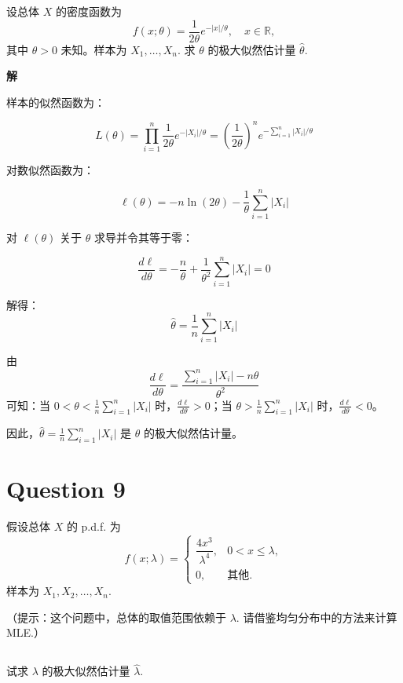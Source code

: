\documentclass[12pt,a4paper]{article}
\begin{document}
设总体 $X$ 的密度函数为
\[
    f(x;\theta)=\frac{1}{2\theta}e^{-\lvert x\rvert/\theta},\quad x\in\mathbb{R},
\]
其中 $\theta>0$ 未知。样本为 $X_1,\ldots,X_n$. 求 $\theta$ 的极大似然估计量 $\hat{\theta}$.

\begin{answerbox}
\textbf{解}  
  
样本的似然函数为：

  $$
  L(\theta) = \prod_{i=1}^n \frac{1}{2\theta} e^{-|X_i|/\theta} = \left(\frac{1}{2\theta}\right)^n e^{-\sum_{i=1}^n |X_i|/\theta}
  $$

  对数似然函数为：

  $$
  \ell(\theta) = -n \ln(2\theta) - \frac{1}{\theta} \sum_{i=1}^n |X_i|
  $$

  对 $\ell(\theta)$ 关于 $\theta$ 求导并令其等于零：

  $$
  \frac{d\ell}{d\theta} = -\frac{n}{\theta} + \frac{1}{\theta^2} \sum_{i=1}^n |X_i| = 0
  $$

  解得：
  $$\hat{\theta} = \frac{1}{n}\sum_{i=1}^n |X_i|$$

  由
  \[
    \frac{d\ell}{d\theta}
    = \frac{\sum_{i=1}^n |X_i| - n\theta}{\theta^2}
  \]
  可知：当 $0 < \theta < \frac{1}{n}\sum_{i=1}^n |X_i|$ 时，$\frac{d\ell}{d\theta} > 0$；当 $\theta > \frac{1}{n}\sum_{i=1}^n |X_i|$ 时，$\frac{d\ell}{d\theta} < 0$。
  
  因此，$\hat{\theta} = \frac{1}{n}\sum_{i=1}^n |X_i|$ 是 $\theta$ 的极大似然估计量。


\end{answerbox}

\section{Question 9}

假设总体 $X$ 的 p.d.f. 为
\[
    f(x;\lambda)=
    \begin{cases}
        \dfrac{4x^3}{\lambda^4}, & 0<x\le \lambda,\\
        0, & \text{其他}.
    \end{cases}
\]
样本为 $X_1,X_2,\ldots,X_n$.

（提示：这个问题中，总体的取值范围依赖于 $\lambda$. 请借鉴均匀分布中的方法来计算 MLE.）


\subsection{}
试求 $\lambda$ 的极大似然估计量 $\hat{\lambda}$.
\end{document}
